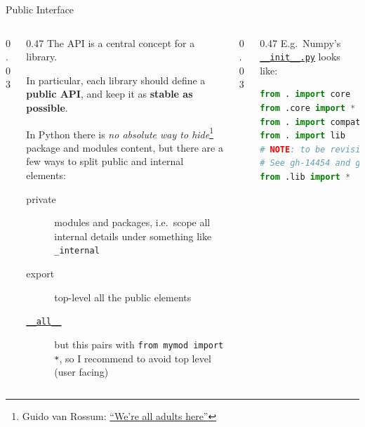 \documentclass[9pt]{beamer}
\begin{document}
\begin{frame}[fragile]{Public Interface}
    \vspace*{30pt}
    \begin{columns}
        \begin{column}{0.03\textwidth}
        \end{column}
        \begin{column}{0.47\textwidth}
            The API is a central concept for a library.

            In particular, each library should define a \alert{\textbf{public
            API}}, and keep it as \textbf{stable as possible}.
            \vspace*{20pt}

            In Python there is \textit{no absolute way to hide}\footnote{
                Guido van Rossum:
                \href{https://therealadam.com/2016/09/26/were-all-adults-here-but-were-not-all-mind-readers/}{\enquote{We're all adults here}}
            } package and
            modules content, but there are a few ways to split public and
            internal elements:

            \begin{description}
                \item[private] modules and packages, i.e.\ scope all internal
                  details under something like \texttt{\_internal}
                \item[export] top-level all the public elements
                \item[\href{https://docs.python.org/3/tutorial/modules.html\#importing-from-a-package}{\texttt{\_\_all\_\_}}]
                    but this pairs with \texttt{from mymod import *}, so I
                    recommend to avoid top level (user facing)
            \end{description}
            \vspace*{20pt}
        \end{column}
        \begin{column}{0.03\textwidth}
        \end{column}
        \begin{column}{0.47\textwidth}
            E.g.\ Numpy's
            \href{https://github.com/numpy/numpy/blob/86cd584b81385508f7d939fc66393a6a27f02659/numpy/__init__.py#L140-L155}{\texttt{\_\_init\_\_.py}}
            looks like:

            \begin{lstlisting}[language=Python,style=mystyle,firstnumber=140]
from . import core
from .core import *
from . import compat
from . import lib
# NOTE: to be revisited following future namespace cleanup.
# See gh-14454 and gh-15672 for discussion.
from .lib import *



\end{lstlisting}
\end{column}
\end{columns}
\end{frame}
\end{document}
